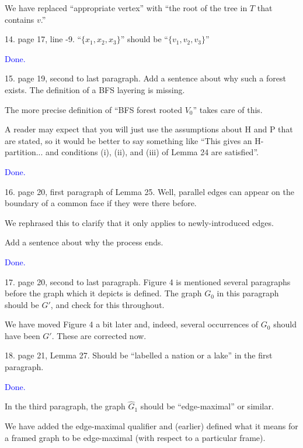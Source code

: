 \documentclass[12pt]{article}
\newcommand{\done}{\textcolor{blue}{Done.}}
\newenvironment{response}{\color{blue}}{}
\begin{document}
\begin{response}
  We have replaced ``appropriate vertex'' with ``the root of the tree in $T$ that contains $v$.''
\end{response}


14. page 17, line -9. “$\{x_1, x_2, x_3\}$” should be “$\{v_1, v_2, v_3\}$”

\done

15. page 19, second to last paragraph. Add a sentence about why such
a forest exists. The definition of a BFS layering is missing.


\begin{response}
  The more precise definition of ``BFS forest rooted $V_0$'' takes care of this.
\end{response}

A reader may expect that you will just use the assumptions about H and P that are stated, so it would be better to say something like “This gives an H-partition... and conditions (i), (ii), and (iii) of Lemma 24 are satisfied”.

\done


16. page 20, first paragraph of Lemma 25. Well, parallel edges can appear
on the boundary of a common face if they were there before.

\begin{response}
  We rephrased this to clarify that it only applies to newly-introduced edges.
\end{response}


Add a sentence about why the process ends.

\done

17. page 20, second to last paragraph. Figure 4 is mentioned several paragraphs before the graph which it depicts is defined. The graph $G_0$ in
this paragraph should be $G'$, and check for this throughout.

\begin{response}
  We have moved Figure 4 a bit later and, indeed, several occurrences of $G_0$ should have been $G'$.  These are corrected now.
\end{response}

18. page 21, Lemma 27. Should be “labelled a nation or a lake” in the
first paragraph.

\done

In the third paragraph, the graph $\hat{G}_1$ should be “edge-maximal” or similar.

\begin{response}
  We have added the edge-maximal qualifier and (earlier) defined what it means for a framed graph to be edge-maximal (with respect to a particular frame).
\end{response}
\end{document}
